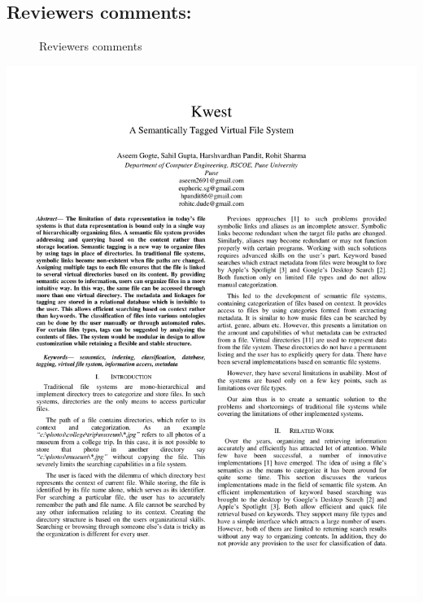 \subsection{Reviewers comments:}
\begin{figure}[htb]
\centering
\setlength\fboxsep{0pt}
\setlength\fboxrule{0.5pt}
\caption{Reviewers comments}
\label{fig:dfd0}
\end{figure}
\hspace*{-1.5cm}
\includegraphics[page=1,scale=0.75]{./appendix/sem1.pdf}



